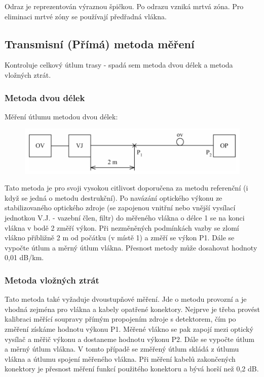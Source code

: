 Odraz je reprezentován výraznou špičkou. Po odrazu vzniká mrtvá zóna. Pro eliminaci mrtvé zóny se používají předřadná vlákna.

\subsection{Transmisní (Přímá) metoda měření}
Kontroluje celkový útlum trasy - spadá sem metoda dvou délek a metoda vložných ztrát.

\subsubsection{Metoda dvou délek}
Měření útlumu metodou dvou délek:

\begin{figure}[!ht]
\begin{center}
    \includegraphics[scale=1]{obrazky/dvedel.png}
  \end{center}
\end{figure}
Tato metoda je pro svoji vysokou citlivost doporučena za metodu referenční (i když se jedná o metodu destrukční). Po navázání optického výkonu ze stabilizovaného optického zdroje (se zapojenou vnitřní nebo vnější vysílací jednotkou V.J. - vazební člen, filtr) do měřeného vlákna o délce 1 se na konci vlákna v bodě 2 změří výkon. Při nezměněných podmínkách vazby se zlomí vlákno přibližně 2 m od počátku (v místě 1) a změří se výkon P1. Dále se vypočte útlum a měrný útlum vlákna. Přesnost metody může dosahovat hodnoty 0,01 dB/km. 

\subsubsection{Metoda vložných ztrát}
Tato metoda také vyžaduje dvoustupňové měření. Jde o metodu provozní a je vhodná zejména pro vlákna a kabely opatřené konektory. Nejprve je třeba provést kalibraci měřící soupravy přímým propojením zdroje s detektorem, čím po změření získáme hodnotu výkonu P1. Měřené vlákno se pak zapojí mezi optický vysílač a měřič výkonu a dostaneme hodnotu výkonu P2. Dále se vypočte útlum a měrný útlum vlákna. V tomto případě se změřený útlum skládá z útlumu vlákna a útlumu spojení měřeného vlákna. Při měření kabelů zakončených konektory je přesnost měření funkcí použitého konektoru a bývá horší než 0,2 dB.

